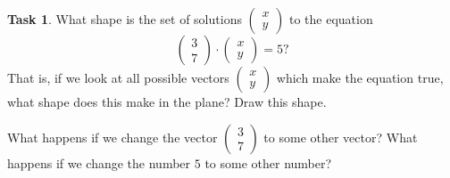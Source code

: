 \documentclass{tufte-book}
\theoremstyle{definition}
\newtheorem{task}{Task}
\begin{document}
\begin{task}
What shape is the set of solutions $\left(\begin{smallmatrix} x \\ y \end{smallmatrix}\right)$ to the equation
\[
\begin{pmatrix} 3 \\ 7\end{pmatrix} \cdot \begin{pmatrix} x \\ y \end{pmatrix} = 5?
\] 
That is, if we look at all possible vectors $\left(\begin{smallmatrix} x \\ y \end{smallmatrix}\right)$
which make the equation true, what shape does this make in the plane? Draw this shape.

What happens if we change the vector $\left(\begin{smallmatrix} 3 \\ 7 \end{smallmatrix}\right)$ to some other vector? What happens if we change the number $5$ to some other number?
\end{task}
\end{document}
